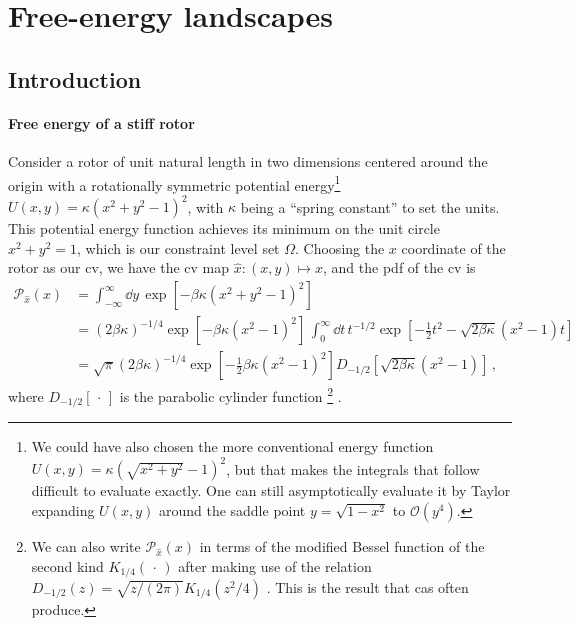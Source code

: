 
\chapter{Free-energy landscapes}

\section{Introduction}

\subsubsection{Free energy of a stiff rotor}

Consider a rotor of unit natural length in two dimensions centered around the origin with a rotationally symmetric potential energy\footnote{We could have also chosen the more conventional energy function $U(x, y) = \kappa(\sqrt{x^2 + y^2} - 1)^2$, but that makes the integrals that follow difficult to evaluate exactly.  One can still asymptotically evaluate it by Taylor expanding $U(x, y)$ around the saddle point $y = \sqrt{1 - x^2}$ to $\mathcal{O}(y^4)$.} $U(x, y) = \kappa(x^2 + y^2 - 1)^2$, with $\kappa$ being a ``spring constant'' to set the units.
This potential energy function achieves its minimum on the unit circle $x^2 + y^2 = 1$, which is our constraint level set $\Omega$.
Choosing the $x$ coordinate of the rotor as our \ac{cv}, we have the \ac{cv} map $\hat{x}: (x,y) \mapsto x$, and the \ac{pdf} of the \ac{cv} is
%
\begin{equation}
  \begin{aligned}
    \mathcal{P}_{\hat{x}}(x) &= \int_{-\infty}^{\infty} \dd{y}\, \exp\left[-\beta\kappa(x^2 + y^2 - 1)^2\right]\\
                             &= (2\beta\kappa)^{-1/4}\exp\left[-\beta\kappa(x^2 - 1)^2\right]\,\int_{0}^{\infty} \dd{t}\,t^{-1/2}\exp\left[-\tfrac{1}{2}t^2 - \sqrt{2\beta\kappa}(x^2 - 1)t\right]\\
                             &= \sqrt{\pi}(2\beta\kappa)^{-1/4}\exp\left[-\tfrac{1}{2}\beta\kappa(x^2 - 1)^2\right]D_{-1/2}\left[\sqrt{2\beta\kappa}(x^2 - 1)\right]\,,
  \end{aligned}
\end{equation}
%
where $D_{-1/2}[\,\cdot\,]$ is the parabolic cylinder function%
\footnote{We can also write $\mathcal{P}_{\hat{x}}(x)$ in terms of the modified Bessel function of the second kind $K_{1/4}(\,\cdot\,)$ after making use of the relation $D_{-1/2}(z) = \sqrt{z/(2\pi)}K_{1/4}(z^2/4)$ \cite[Eq.~12.7.10]{olver2010}.
This is the result that \ac{cas} often produce.} \cite[Eq.~12.5.1]{olver2010}.
